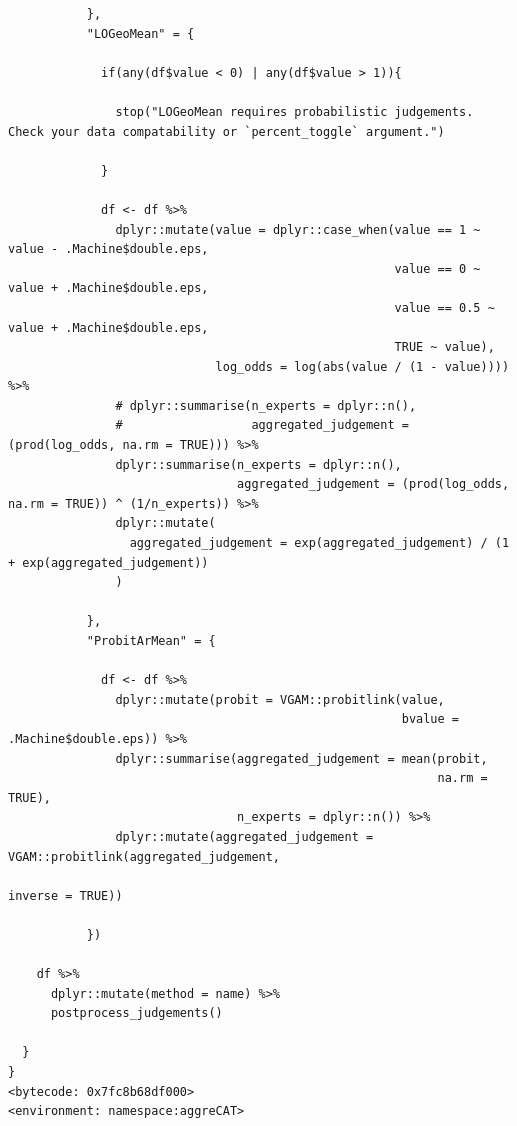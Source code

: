 \documentclass[article]{jss}
\begin{document}
\begin{tcolorbox}[enhanced jigsaw, colframe=quarto-callout-color-frame, left=2mm, opacityback=0, bottomrule=.15mm, breakable, arc=.35mm, leftrule=.75mm, rightrule=.15mm, toprule=.15mm, colback=white]
\begin{verbatim}
           },
           "LOGeoMean" = {

             if(any(df$value < 0) | any(df$value > 1)){

               stop("LOGeoMean requires probabilistic judgements. Check your data compatability or `percent_toggle` argument.")

             }

             df <- df %>%
               dplyr::mutate(value = dplyr::case_when(value == 1 ~ value - .Machine$double.eps,
                                                      value == 0 ~ value + .Machine$double.eps,
                                                      value == 0.5 ~ value + .Machine$double.eps,
                                                      TRUE ~ value),
                             log_odds = log(abs(value / (1 - value)))) %>%
               # dplyr::summarise(n_experts = dplyr::n(),
               #                  aggregated_judgement = (prod(log_odds, na.rm = TRUE))) %>%
               dplyr::summarise(n_experts = dplyr::n(),
                                aggregated_judgement = (prod(log_odds, na.rm = TRUE)) ^ (1/n_experts)) %>%
               dplyr::mutate(
                 aggregated_judgement = exp(aggregated_judgement) / (1 + exp(aggregated_judgement))
               )

           },
           "ProbitArMean" = {

             df <- df %>%
               dplyr::mutate(probit = VGAM::probitlink(value,
                                                       bvalue = .Machine$double.eps)) %>%
               dplyr::summarise(aggregated_judgement = mean(probit,
                                                            na.rm = TRUE),
                                n_experts = dplyr::n()) %>%
               dplyr::mutate(aggregated_judgement = VGAM::probitlink(aggregated_judgement,
                                                                     inverse = TRUE))

           })

    df %>%
      dplyr::mutate(method = name) %>%
      postprocess_judgements()

  }
}
<bytecode: 0x7fc8b68df000>
<environment: namespace:aggreCAT>
\end{verbatim}


\end{tcolorbox}
\end{document}
